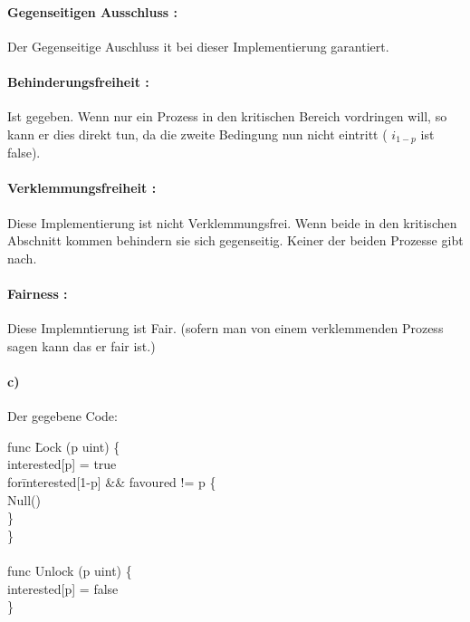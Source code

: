 \paragraph{ Gegenseitigen Ausschluss : }

Der Gegenseitige Auschluss it bei dieser Implementierung garantiert.

\paragraph{ Behinderungsfreiheit : } Ist gegeben. Wenn nur ein Prozess in den kritischen Bereich vordringen will, so kann er dies direkt tun, da die zweite Bedingung  nun nicht eintritt ( $ i_{1-p} $ ist false).


\paragraph{ Verklemmungsfreiheit : }
Diese Implementierung ist nicht Verklemmungsfrei. Wenn beide in den kritischen Abschnitt kommen behindern sie sich gegenseitig. Keiner der beiden Prozesse gibt nach.

\paragraph{ Fairness : } 
Diese Implemntierung ist Fair. (sofern man von einem verklemmenden Prozess sagen kann das er fair ist.)

\newpage

\paragraph{ c) }


Der gegebene Code:

\begin{mylisting}
\begin{tabbing}

func \= Lock (p uint) \{ \\ 
\>	interested[p] = true  \\
\>	for\=  interested[1-p] \&\& favoured != p \{  \\
\>	\>	Null() \\
\>	\} \\
\} \\
\\

func Unlock (p uint) \{ \\
\>	interested[p] = false \\
\} \\

\end{tabbing} 

\end{mylisting}

